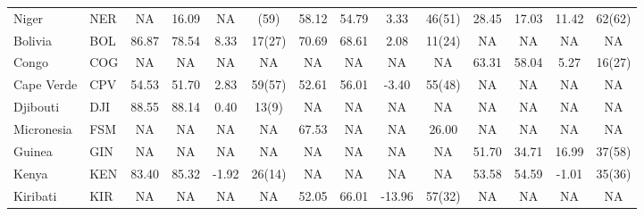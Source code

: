 \begin{longtable}{m{2.4cm}lcccc|cccc|cccc}
Niger                             & NER           & NA               & 16.09              & NA               & (59)             & 58.12    & 54.79      & 3.33     & 46(51)   & 28.45           & 17.03             & 11.42           & 62(62)          \\
Bolivia                           & BOL           & 86.87            & 78.54              & 8.33             & 17(27)           & 70.69    & 68.61      & 2.08     & 11(24)   & NA              & NA                & NA              & NA              \\
Congo                             & COG           & NA               & NA                 & NA               & NA               & NA       & NA         & NA       & NA       & 63.31           & 58.04             & 5.27            & 16(27)          \\
Cape Verde                        & CPV           & 54.53            & 51.70              & 2.83             & 59(57)           & 52.61    & 56.01      & -3.40    & 55(48)   & NA              & NA                & NA              & NA              \\
Djibouti                          & DJI           & 88.55            & 88.14              & 0.40             & 13(9)            & NA       & NA         & NA       & NA       & NA              & NA                & NA              & NA              \\
Micronesia                        & FSM           & NA               & NA                 & NA               & NA               & 67.53    & NA         & NA       & 26.00    & NA              & NA                & NA              & NA              \\
Guinea                            & GIN           & NA               & NA                 & NA               & NA               & NA       & NA         & NA       & NA       & 51.70           & 34.71             & 16.99           & 37(58)          \\
Kenya                             & KEN           & 83.40            & 85.32              & -1.92            & 26(14)           & NA       & NA         & NA       & NA       & 53.58           & 54.59             & -1.01           & 35(36)          \\
Kiribati                          & KIR           & NA               & NA                 & NA               & NA               & 52.05    & 66.01      & -13.96   & 57(32)   & NA              & NA                & NA              & NA              \\

\end{longtable}
